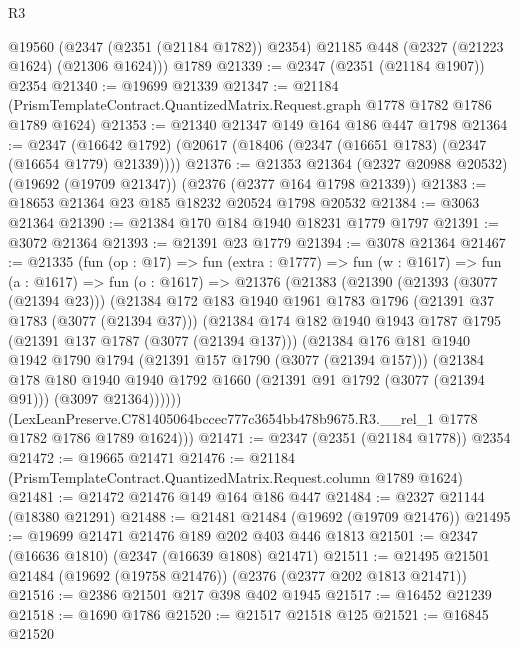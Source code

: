 \begin{lexlean}{R3}
\begin{coremodule}
    @19560 (@2347 (@2351 (@21184 @1782)) @2354) @21185 @448 (@2327 (@21223 @1624) (@21306 @1624)))
    @1789
@21339 := @2347 (@2351 (@21184 @1907)) @2354
@21340 := @19699 @21339
@21347 := @21184 (PrismTemplateContract.QuantizedMatrix.Request.graph @1778 @1782 @1786 @1789 @1624)
@21353 := @21340 @21347 @149 @164 @186 @447 @1798
@21364 := @2347
    (@16642 @1792)
    (@20617 (@18406 (@2347 (@16651 @1783) (@2347 (@16654 @1779) @21339))))
@21376 := @21353
    @21364
    (@2327 @20988 @20532)
    (@19692 (@19709 @21347))
    (@2376 (@2377 @164 @1798 @21339))
@21383 := @18653 @21364 @23 @185 @18232 @20524 @1798 @20532
@21384 := @3063 @21364
@21390 := @21384 @170 @184 @1940 @18231 @1779 @1797
@21391 := @3072 @21364
@21393 := @21391 @23 @1779
@21394 := @3078 @21364
@21467 := @21335
    (fun (op : @17) =>
    fun (extra : @1777) =>
    fun (w : @1617) =>
    fun (a : @1617) =>
    fun (o : @1617) =>
    @21376
      (@21383
        (@21390
          (@21393 (@3077 (@21394 @23)))
          (@21384
            @172
            @183
            @1940
            @1961
            @1783
            @1796
            (@21391 @37 @1783 (@3077 (@21394 @37)))
            (@21384
              @174
              @182
              @1940
              @1943
              @1787
              @1795
              (@21391 @137 @1787 (@3077 (@21394 @137)))
              (@21384
                @176
                @181
                @1940
                @1942
                @1790
                @1794
                (@21391 @157 @1790 (@3077 (@21394 @157)))
                (@21384
                  @178
                  @180
                  @1940
                  @1940
                  @1792
                  @1660
                  (@21391 @91 @1792 (@3077 (@21394 @91)))
                  (@3097 @21364))))))
        (LexLeanPreserve.C781405064bccec777c3654bb478b9675.R3.__rel_1
          @1778
          @1782
          @1786
          @1789
          @1624)))
@21471 := @2347 (@2351 (@21184 @1778)) @2354
@21472 := @19665 @21471
@21476 := @21184 (PrismTemplateContract.QuantizedMatrix.Request.column @1789 @1624)
@21481 := @21472 @21476 @149 @164 @186 @447
@21484 := @2327 @21144 (@18380 @21291)
@21488 := @21481 @21484 (@19692 (@19709 @21476))
@21495 := @19699 @21471 @21476 @189 @202 @403 @446 @1813
@21501 := @2347 (@16636 @1810) (@2347 (@16639 @1808) @21471)
@21511 := @21495 @21501 @21484 (@19692 (@19758 @21476)) (@2376 (@2377 @202 @1813 @21471))
@21516 := @2386 @21501 @217 @398 @402 @1945
@21517 := @16452 @21239
@21518 := @1690 @1786
@21520 := @21517 @21518 @125
@21521 := @16845 @21520

\end{coremodule}
\end{lexlean}
